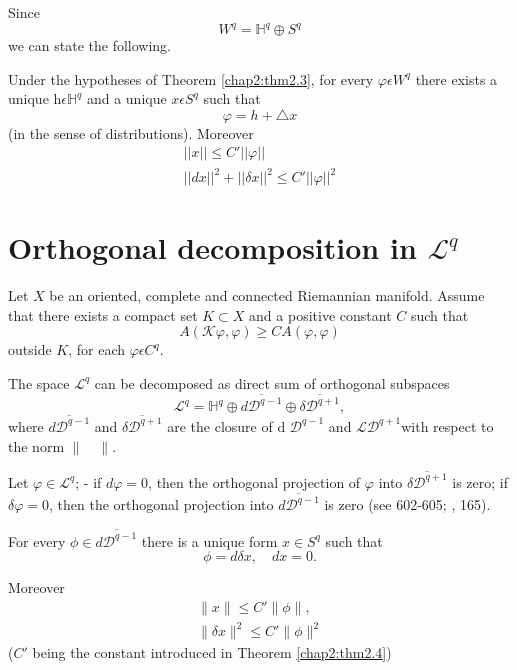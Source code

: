 Since
$$ 
W^q = \mathbb{H}^q \oplus S^q
$$
we can state the following.

\begin{prop}%
  Under the hypotheses of Theorem \ref{chap2:thm2.3}, for every 
  $\varphi \epsilon W^q$ there exists a unique h$\epsilon
  \mathbb{H}^q$ and a unique $x \epsilon S^q$ such that 
  $$
  \varphi = h + \triangle x
  $$
  (in the sense of distributions). Moreover
  \begin{gather*}
    ||x||\leqslant C{'}||\varphi||\\
    ||dx||^2 + ||\delta x||^2 \leqslant C{'} ||\varphi||^2
  \end{gather*}
\end{prop}

\section{Orthogonal decomposition in $\mathcal{L}^q$}%

Let $X$ be an oriented, complete and connected Riemannian
manifold. Assume that there exists a compact set $K \subset X$ 
and a positive constant $C$ such that
$$
A (\mathcal{K} \varphi, \varphi) \geqslant C A (\varphi, \varphi) 
$$
outside $K$, for each $\varphi\epsilon C^q$.

The space $\mathcal{L}^q$ can be decomposed as direct sum of
orthogonal subspaces 
$$
\mathcal{L}^q = \mathbb{H}^q \oplus \overline{d\mathscr{D}^{q-1}} 
\oplus \overline{\delta \mathscr{D}^{q+1}},
$$
where $\overline{d \mathscr{D}^{q-1}}$ and $\overline{\delta
  \mathscr{D}^{q+1}}$ are the closure of d $\mathscr{D}^{q-1}$ and
$ \mathcal{L} \mathcal{D}^{q+1}$\pageoriginale with respect to the
norm $ \parallel \quad  \parallel$.  

Let $ \varphi \in \mathcal{L}^q$; - if  $d \varphi = 0$, then the
orthogonal projection of $\varphi$ into $ \overline{\delta
  \mathcal{D}^{q+1}}$  is zero; if $\delta \varphi =0$, then the
orthogonal projection 
into $  \overline{d \mathcal{D}^{q-1}} $ is zero (see \cite{key17}
602-605; \cite{key29}, 165).

\begin{lemma}\label{chap2:lem2.8}%
  For every $\phi \in \overline{d \mathcal{D}^{q-1}}$ there is a
  unique form $x\in S^q$ such that  
  $$ 
  \phi =d \delta  x, \quad dx=0. 
  $$ 

  Moreover
\begin{gather*}
  \parallel x \parallel \leq C' \parallel \phi \parallel,\\ 
  \parallel \delta x \parallel^2 \leq C' \parallel \phi \parallel^2 
\end{gather*}
($C'$ being the constant introduced in Theorem \ref{chap2:thm2.4})
\end{lemma}

